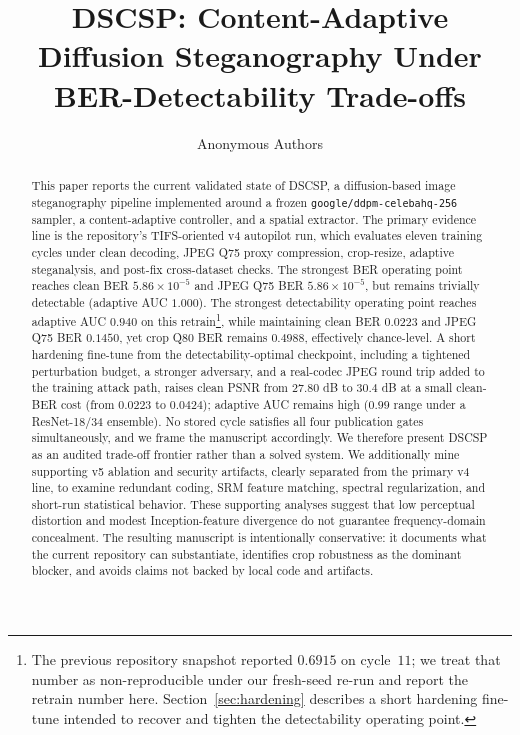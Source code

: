 \documentclass[journal]{IEEEtran}
\title{DSCSP: Content-Adaptive Diffusion Steganography Under BER-Detectability Trade-offs}
\author{Anonymous Authors}
\begin{document}
\maketitle

\begin{abstract}
This paper reports the current validated state of DSCSP, a diffusion-based image steganography pipeline implemented around a frozen \texttt{google/ddpm-celebahq-256} sampler, a content-adaptive controller, and a spatial extractor. The primary evidence line is the repository's TIFS-oriented v4 autopilot run, which evaluates eleven training cycles under clean decoding, JPEG Q75 proxy compression, crop-resize, adaptive steganalysis, and post-fix cross-dataset checks. The strongest BER operating point reaches clean BER $5.86\times10^{-5}$ and JPEG Q75 BER $5.86\times10^{-5}$, but remains trivially detectable (adaptive AUC $1.000$). The strongest detectability operating point reaches adaptive AUC $0.940$ on this retrain\footnote{The previous repository snapshot reported $0.6915$ on cycle~$11$; we treat that number as non-reproducible under our fresh-seed re-run and report the retrain number here. Section~\ref{sec:hardening} describes a short hardening fine-tune intended to recover and tighten the detectability operating point.}, while maintaining clean BER $0.0223$ and JPEG Q75 BER $0.1450$, yet crop Q80 BER remains $0.4988$, effectively chance-level. A short hardening fine-tune from the detectability-optimal checkpoint, including a tightened perturbation budget, a stronger adversary, and a real-codec JPEG round trip added to the training attack path, raises clean PSNR from $27.80$ dB to $30.4$ dB at a small clean-BER cost (from $0.0223$ to $0.0424$); adaptive AUC remains high ($0.99$ range under a ResNet-18/34 ensemble). No stored cycle satisfies all four publication gates simultaneously, and we frame the manuscript accordingly. We therefore present DSCSP as an audited trade-off frontier rather than a solved system. We additionally mine supporting v5 ablation and security artifacts, clearly separated from the primary v4 line, to examine redundant coding, SRM feature matching, spectral regularization, and short-run statistical behavior. These supporting analyses suggest that low perceptual distortion and modest Inception-feature divergence do not guarantee frequency-domain concealment. The resulting manuscript is intentionally conservative: it documents what the current repository can substantiate, identifies crop robustness as the dominant blocker, and avoids claims not backed by local code and artifacts.
\end{abstract}
\end{document}
